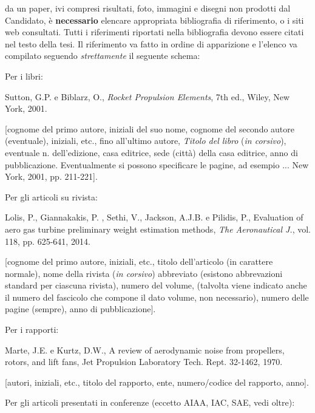 \documentclass{baer}
\begin{document}
%
%

\begin{thebibliography}{99}
da un paper, ivi compresi risultati, foto, immagini e
disegni non prodotti dal Candidato, è  \textbf{necessario}
elencare appropriata bibliografia di riferimento, o i siti
web consultati. Tutti i riferimenti riportati nella bibliografia
devono essere citati nel testo della tesi. Il riferimento va
fatto in ordine di apparizione e l’elenco va compilato 
seguendo  \textit{strettamente} il seguente schema:

Per i libri:

 Sutton, G.P. e Biblarz, O., \textit{Rocket Propulsion Elements}, 7th ed., Wiley, New York, 2001.

[cognome del primo autore, iniziali del suo nome, cognome del secondo autore (eventuale), iniziali, etc., fino all'ultimo autore, \textit{Titolo del libro} (\textit{in corsivo}), eventuale n. dell'edizione, casa editrice, sede (città) della  casa editrice, anno di pubblicazione. Eventualmente si possono specificare le pagine, ad esempio ... New York, 2001, pp. 211-221]. 

Per gli articoli su rivista:

 Lolis, P., Giannakakis, P. , Sethi, V., Jackson, A.J.B. e Pilidis, P., Evaluation of aero gas turbine preliminary weight estimation methods, \textit{The Aeronautical J.}, vol. 118, pp. 625-641, 2014.

[cognome del primo autore, iniziali, etc., titolo dell'articolo (in carattere normale), nome della rivista (\textit{in corsivo}) abbreviato (esistono abbrevazioni standard per ciascuna rivista), numero del volume, (talvolta viene indicato anche il numero del fascicolo che compone il dato volume, non necessario), numero delle pagine (sempre), anno di pubblicazione].

Per i rapporti:

 Marte, J.E. e Kurtz, D.W., A review of aerodynamic noise from propellers, rotors, and lift fans, Jet Propulsion Laboratory Tech. Rept. 32-1462, 1970.

[autori, iniziali, etc., titolo del rapporto, ente, numero/codice del rapporto, anno].

Per gli articoli presentati in conferenze (eccetto AIAA, IAC, SAE, vedi oltre):


\end{thebibliography}
\end{document}
